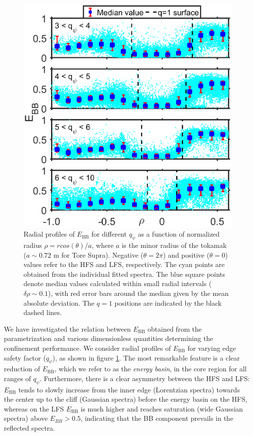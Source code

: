 \begin{figure}[h]
\begin{centering}
\includegraphics[scale=0.6]{fig_EBB_OH.eps}
\par\end{centering}
\caption{Radial profiles of $E_\mathrm{BB}$ for different $q_{\psi}$ as a function of normalized radius $\rho = rcos(\theta)/a$, where $a$ is the minor radius of the tokamak ($a \sim 0.72$ m for Tore Supra). Negative ($\theta = 2\pi$) and positive ($\theta = 0$) values refer to the HFS and LFS, respectively. The cyan points are obtained from the individual fitted spectra. The blue square points denote median values calculated within small radial intervals ($\delta\rho \sim 0.1$), with red error bars around the median given by the mean absolute deviation. The $q = 1$ positions are indicated by the black dashed lines.}
\label{fig:EBBOhmic}
\end{figure}

We have investigated the relation between $E_\mathrm{BB}$ obtained from the parametrization and various dimensionless quantities determining the confinement performance. We consider radial profiles of $E_\mathrm{BB}$ for varying edge safety factor ($q_{\psi}$), as shown in figure \ref{fig:EBBOhmic}. The most remarkable feature is a clear reduction of $E_\mathrm{BB}$, which we refer to as the \emph{energy basin}, in the core region for all ranges of $q_{\psi}$. Furthermore, there is a clear asymmetry between the HFS and LFS: $E_\mathrm{BB}$ tends to slowly increase from the inner edge (Lorentzian spectra) towards the center up to the cliff (Gaussian spectra) before the energy basin on the HFS, whereas on the LFS $E_\mathrm{BB}$ is much higher and reaches saturation (wide Gaussian spectra) above $E_{BB} > 0.5$, indicating that the BB component prevails in the reflected spectra.


